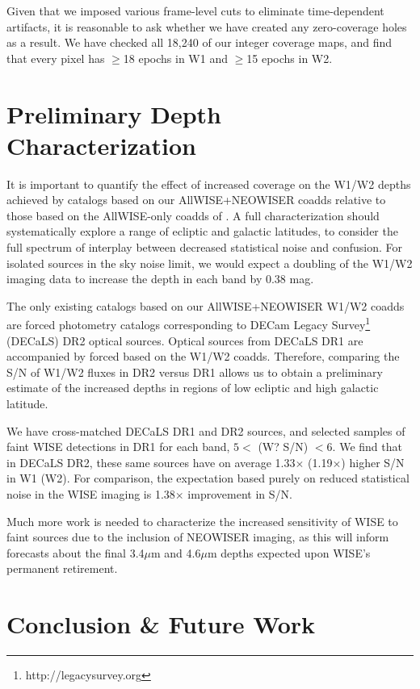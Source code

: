 \documentclass{emulateapj}
\begin{document}
Given that we imposed various frame-level cuts to eliminate time-dependent 
artifacts, it is reasonable to ask whether we have created any zero-coverage 
holes as a result. We have checked all 18,240 of our integer coverage maps, and
find that every pixel has $\ge$18 epochs in W1 and $\ge$15 epochs in W2.


\section{Preliminary Depth Characterization}
\label{sec:depth}

It is important to quantify the effect of increased coverage on
the W1/W2 depths achieved by catalogs based on our AllWISE+NEOWISER coadds 
relative to those based on the AllWISE-only coadds of \cite{lang14}. A
full characterization should systematically explore a range of 
ecliptic and galactic latitudes, to consider the full spectrum of interplay
between decreased statistical noise and confusion. For isolated sources in the 
sky noise limit, we would expect a doubling of the W1/W2 imaging data
to increase the depth in each band by 0.38 mag.

The only existing catalogs based on our AllWISE+NEOWISER W1/W2 coadds
are forced photometry catalogs corresponding to DECam Legacy
Survey\footnote{http://legacysurvey.org} (DECaLS) DR2 optical sources. 
Optical sources from DECaLS DR1 are accompanied by forced based on the
\cite{lang14} W1/W2 coadds. Therefore, comparing the S/N of W1/W2
fluxes in DR2 versus DR1 allows us to obtain a preliminary estimate of the 
increased depths in regions of low ecliptic and high galactic latitude.

We have cross-matched DECaLS DR1 and DR2 sources, and selected samples of
faint WISE detections in DR1 for each band, $5<$ (W? S/N) $<6$. We find that
in DECaLS DR2, these same sources have on average 1.33$\times$ (1.19$\times$)
higher S/N in W1 (W2). For comparison, the expectation based purely on
reduced statistical noise in the WISE imaging is 1.38$\times$ improvement in
S/N.

Much more work is needed to characterize the increased sensitivity
of WISE to faint sources due to the inclusion of NEOWISER
imaging, as this will inform forecasts about the final 3.4$\mu$m and 
4.6$\mu$m depths expected upon WISE's permanent retirement.

\section{Conclusion \& Future Work}
\label{sec:future}
\end{document}
